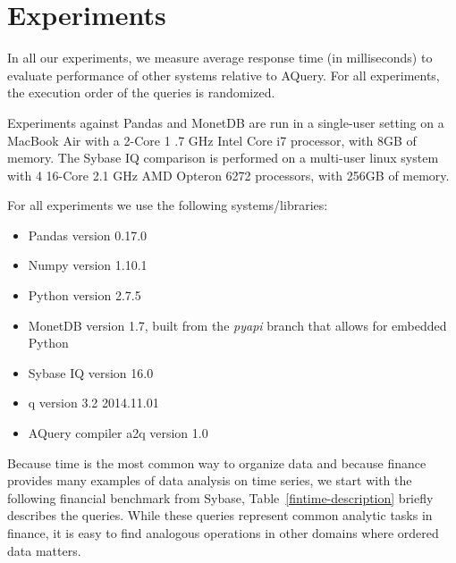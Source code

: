 \documentclass{acm_proc_article-sp}
\begin{document}
\section{Experiments}
In all our experiments, we measure average response time (in milliseconds) to evaluate performance of
other systems relative to AQuery. For all experiments, the execution order of the queries is randomized.

Experiments against Pandas and MonetDB are run 
in a single-user setting on a MacBook Air with a 2-Core 1 .7 GHz Intel Core i7 processor, with 8GB of
memory. The Sybase IQ comparison
is performed on a multi-user linux system with 4 16-Core 2.1 GHz AMD Opteron 6272 processors, with 
256GB of memory.

For all experiments we use the following systems/libraries:
\begin{itemize}
  \item Pandas version 0.17.0
  \item Numpy version 1.10.1
  \item Python version 2.7.5
  \item MonetDB version 1.7, built from the \textit{pyapi} branch that allows for embedded Python
  \item Sybase IQ version 16.0
  \item q version 3.2 2014.11.01
  \item AQuery compiler a2q version 1.0
\end{itemize}

Because time is the most common way to organize data and
because finance provides many examples of data analysis on time series,
we start with the following financial benchmark from Sybase\cite{sybase_rap_benchmark}, Table~\ref{fintime-description} briefly describes the queries. While these queries represent common analytic tasks in finance, it is easy to find analogous operations in other domains where ordered data matters.
\end{document}
